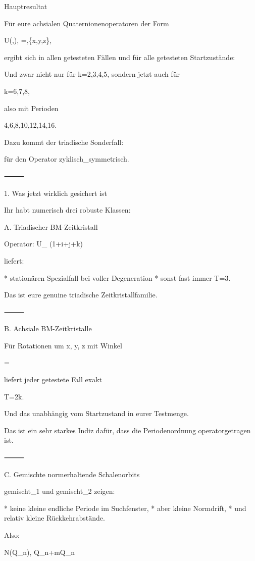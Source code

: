 \documentclass[11pt,a4paper]{article}
\theoremstyle{definition}
\begin{document}
Hauptresultat

Für eure achsialen Quaternionenoperatoren der Form

U(\theta,\alpha), \qquad \theta=,\quad \alpha\in\{x,y,z\},

ergibt sich in allen getesteten Fällen und für alle getesteten Startzustände:


Und zwar nicht nur für k=2,3,4,5, sondern jetzt auch für

k=6,7,8,

also mit Perioden

4,6,8,10,12,14,16.

Dazu kommt der triadische Sonderfall:


für den Operator zyklisch_symmetrisch.

⸻

1. Was jetzt wirklich gesichert ist

Ihr habt numerisch drei robuste Klassen:

A. Triadischer BM-Zeitkristall

Operator:
U_{} \propto (1+i+j+k)

liefert:

* stationären Spezialfall bei voller Degeneration
* sonst fast immer
T=3.

Das ist eure genuine triadische Zeitkristallfamilie.

⸻

B. Achsiale BM-Zeitkristalle

Für Rotationen um x, y, z mit Winkel

\theta=

liefert jeder getestete Fall exakt

T=2k.

Und das unabhängig vom Startzustand in eurer Testmenge.

Das ist ein sehr starkes Indiz dafür, dass die Periodenordnung operatorgetragen ist.

⸻

C. Gemischte normerhaltende Schalenorbits

gemischt_1 und gemischt_2 zeigen:

* keine kleine endliche Periode im Suchfenster,
* aber kleine Normdrift,
* und relativ kleine Rückkehrabstände.

Also:

N(Q_n)\approx {},
\qquad
Q_{n+m}\neq Q_n
\end{document}
